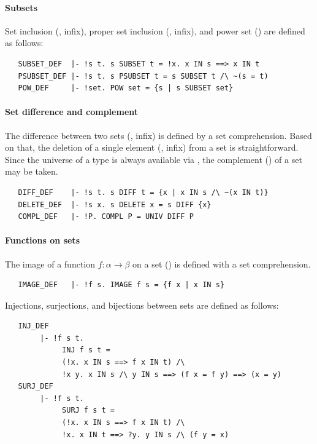 {\paragraph{Subsets}

Set inclusion (, infix), proper set inclusion
(, infix), and power set () are defined as
follows:
%
\begin{hol}
\begin{verbatim}
   SUBSET_DEF  |- !s t. s SUBSET t = !x. x IN s ==> x IN t
   PSUBSET_DEF |- !s t. s PSUBSET t = s SUBSET t /\ ~(s = t)
   POW_DEF     |- !set. POW set = {s | s SUBSET set}
\end{verbatim}
\end{hol}

\paragraph{Set difference and complement}

The difference between two sets (, infix) is defined by a
set comprehension. Based on that, the deletion of a single element
(, infix) from a set is straightforward. Since the
universe of a type is always available via , the
complement () of a set may be taken.
\begin{hol}
\begin{verbatim}
   DIFF_DEF    |- !s t. s DIFF t = {x | x IN s /\ ~(x IN t)}
   DELETE_DEF  |- !s x. s DELETE x = s DIFF {x}
   COMPL_DEF   |- !P. COMPL P = UNIV DIFF P
\end{verbatim}
\end{hol}

\paragraph{Functions on sets}
The image of a function $f :\alpha \to \beta$ on
a set () is defined with a set comprehension.
\begin{hol}
\begin{verbatim}
   IMAGE_DEF   |- !f s. IMAGE f s = {f x | x IN s}
\end{verbatim}
\end{hol}
%
Injections, surjections, and bijections between sets are defined
as follows:
%
\begin{hol}
\begin{verbatim}
   INJ_DEF
        |- !f s t.
             INJ f s t =
             (!x. x IN s ==> f x IN t) /\
             !x y. x IN s /\ y IN s ==> (f x = f y) ==> (x = y)
   SURJ_DEF
        |- !f s t.
             SURJ f s t =
             (!x. x IN s ==> f x IN t) /\
             !x. x IN t ==> ?y. y IN s /\ (f y = x)


\end{verbatim}
\end{hol}}
